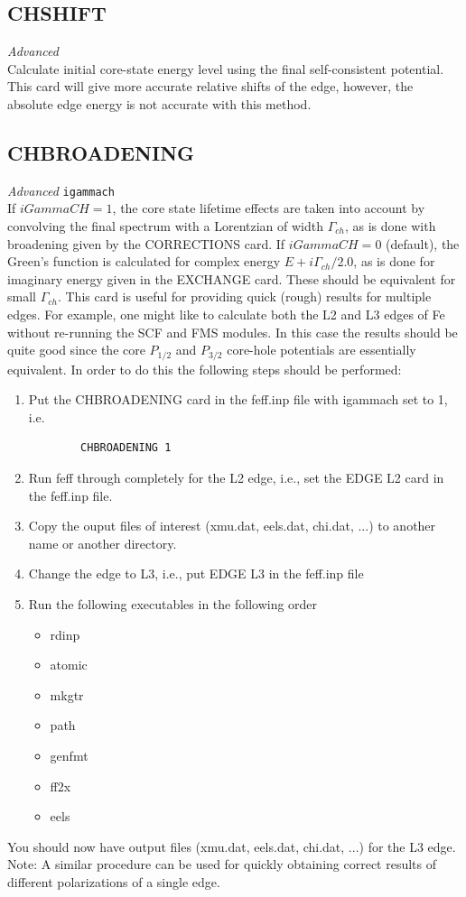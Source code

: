 \documentclass[11pt,oneside]{report} %
\newenvironment{Card}[4]%
      {\vspace{3ex}%
        \subsection{#1}
        \quad\textsl{#3}\newline
        \quad\texttt{#2}\newline%
        \label{card:#4}\\}
      {}
\begin{document}
\begin{Card}{CHSHIFT}{}{Advanced}{csh}
Calculate initial core-state energy level using the final self-consistent potential. This card will give more accurate relative shifts of the edge, however, the absolute edge energy is not accurate with this method.
\end{Card}



\begin{Card}{CHBROADENING}{igammach}{Advanced}{chb}
  If $iGammaCH = 1$, the core state lifetime effects are taken into
  account by convolving the final spectrum with a Lorentzian of width
  $\Gamma_{ch}$, as is done with broadening given by the CORRECTIONS
  card.  If $iGammaCH = 0$ (default), 
  the Green's function is calculated for complex energy $E +
  i\Gamma_{ch}/2.0$, as is done for imaginary energy given in the
  EXCHANGE card. These should be equivalent for small
  $\Gamma_{ch}$. This card is useful for providing quick (rough) results for
  multiple edges. For
  example, one might like to calculate both the L2 and L3 edges of Fe
  without re-running the SCF and FMS modules. In this case the results
  should be quite good since the core $P_{1/2}$ and $P_{3/2}$
  core-hole potentials are essentially equivalent. In order to do this
  the following steps should be performed:

  \begin{enumerate}
    \item{Put the CHBROADENING card in the feff.inp file with igammach
    set to 1, i.e.
    \begin{verbatim}
        CHBROADENING 1
    \end{verbatim}}
    \item{Run feff through completely for the L2 edge, i.e., set
    the EDGE L2 card in the feff.inp file.}
    \item{Copy the ouput files of interest (xmu.dat, eels.dat, chi.dat,
    ...) to another name or another directory.}
    \item{Change the edge to L3, i.e., put EDGE L3 in the feff.inp
    file}
    \item{Run the following executables in the following order
      \begin{itemize}
	\item{rdinp}
	\item{atomic}
	\item{mkgtr}
	\item{path}
	\item{genfmt}
	\item{ff2x}
	\item{eels}
      \end{itemize}}
  \end{enumerate}

  You should now have output files (xmu.dat, eels.dat, chi.dat, ...)
  for the L3 edge. Note: A similar procedure can be used for quickly obtaining
  correct results of different polarizations of a single edge.
\end{Card}
\end{document}
